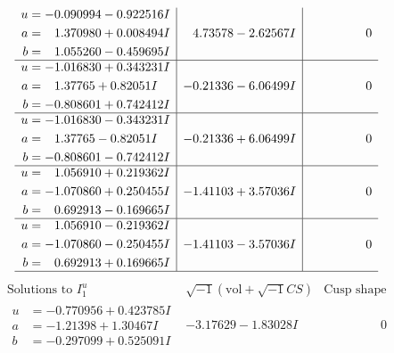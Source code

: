 \documentclass[1p]{elsarticle_modified}
\theoremstyle{definition}
\newcommand{\I}{\sqrt{-1}}
\begin{document}
$$\begin{array}{c|c|c}
\begin{aligned}
u &= -0.090994 - 0.922516 I \\
a &= \phantom{-}1.370980 + 0.008494 I \\
b &= \phantom{-}1.055260 - 0.459695 I\end{aligned}
 & \phantom{-}4.73578 - 2.62567 I & \phantom{-0.000000 } 0 \\ \hline\begin{aligned}
u &= -1.016830 + 0.343231 I \\
a &= \phantom{-}1.37765 + 0.82051 I \\
b &= -0.808601 + 0.742412 I\end{aligned}
 & -0.21336 - 6.06499 I & \phantom{-0.000000 } 0 \\ \hline\begin{aligned}
u &= -1.016830 - 0.343231 I \\
a &= \phantom{-}1.37765 - 0.82051 I \\
b &= -0.808601 - 0.742412 I\end{aligned}
 & -0.21336 + 6.06499 I & \phantom{-0.000000 } 0 \\ \hline\begin{aligned}
u &= \phantom{-}1.056910 + 0.219362 I \\
a &= -1.070860 + 0.250455 I \\
b &= \phantom{-}0.692913 - 0.169665 I\end{aligned}
 & -1.41103 + 3.57036 I & \phantom{-0.000000 } 0 \\ \hline\begin{aligned}
u &= \phantom{-}1.056910 - 0.219362 I \\
a &= -1.070860 - 0.250455 I \\
b &= \phantom{-}0.692913 + 0.169665 I\end{aligned}
 & -1.41103 - 3.57036 I & \phantom{-0.000000 } 0\\
 \hline 
 \end{array}$$\newpage$$\begin{array}{c|c|c}  
\text{Solutions to }I^u_{1}& \I (\text{vol} + \sqrt{-1}CS) & \text{Cusp shape}\\
 \hline 
\begin{aligned}
u &= -0.770956 + 0.423785 I \\
a &= -1.21398 + 1.30467 I \\
b &= -0.297099 + 0.525091 I\end{aligned}
 & -3.17629 - 1.83028 I & \phantom{-0.000000 } 0 \\ \hline\begin{aligned}

\end{aligned}
\end{array}$$
\end{document}

